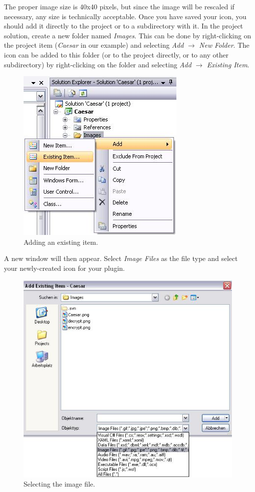 The proper image size is 40x40 pixels, but since the image will be rescaled if necessary, any size is technically acceptable. Once you have saved your icon, you should add it directly to the project or to a subdirectory with it. In the project solution, create a new folder named \textit{Images}. This can be done by right-clicking on the project item (\textit{Caesar} in our example) and selecting \textit{Add $\rightarrow$ New Folder}. The icon can be added to this folder (or to the project directly, or to any other subdirectory) by right-clicking on the folder and selecting \textit{Add $\rightarrow$ Existing Item}.

\begin{figure}[h!]
	\centering
		\includegraphics{figures/add_existing_item.jpg}
	\caption{Adding an existing item.}
	\label{fig:add_existing_item}
\end{figure}
\clearpage

A new window will then appear. Select \textit{Image Files} as the file type and select your newly-created icon for your plugin.

\begin{figure}[h!]
	\centering
		\includegraphics{figures/choose_icon.jpg}
	\caption{Selecting the image file.}
	\label{fig:choose_icon}
\end{figure}
\clearpage

